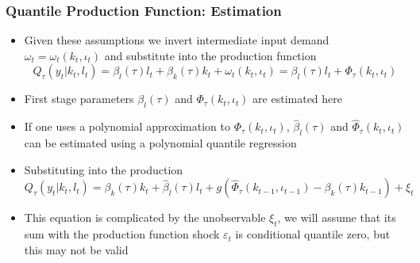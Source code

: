 \documentclass{beamer}
\begin{document}
\begin{frame}
\frametitle{Quantile Production Function: Estimation}
\begin{itemize}
	\item Given these assumptions we invert intermediate input demand $\omega_{t}=\omega_{t}(k_{t}, \iota_{t})$ and substitute into the production function
	\begin{equation}
	Q_{\tau}(y_{t}|k_{t}, l_{t})=\beta_{l}(\tau)l_{t}+\beta_{k}(\tau)k_{t}+\omega_{t}(k_{t}, \iota_{t})=\beta_{l}(\tau)l_{t}+\Phi_{\tau}(k_{t}, \iota_{t})
	\end{equation}
	
	\item First stage parameters $\beta_{l}(\tau)$ and $\Phi_{\tau}(k_{t}, \iota_{t})$ are estimated here
	\item If one uses a polynomial approximation to $\Phi_{\tau}(k_{t}, \iota_{t})$, $\hat{\beta}_{l}(\tau)$ and $\hat{\Phi}_{\tau}(k_{t}, \iota_{t})$ can be estimated using a polynomial quantile regression
	
	\item Substituting into the production
	\begin{equation}
	Q_{\tau}(y_{t}|k_{t}, l_{t})=\beta_{k}(\tau)k_{t}+\hat{\beta}_{l}(\tau)l_{t}+g(\hat{\Phi}_{\tau}(k_{t-1}, \iota_{t-1})-\beta_{k}(\tau)k_{t-1})+\xi_{t}
	\end{equation}
	
	\item This equation is complicated by the unobservable $\xi_{t}$, we will assume that its sum with the production function shock $\varepsilon_{t}$ is conditional quantile zero, but this may not be valid
\end{itemize}
\end{frame}

\end{document}
